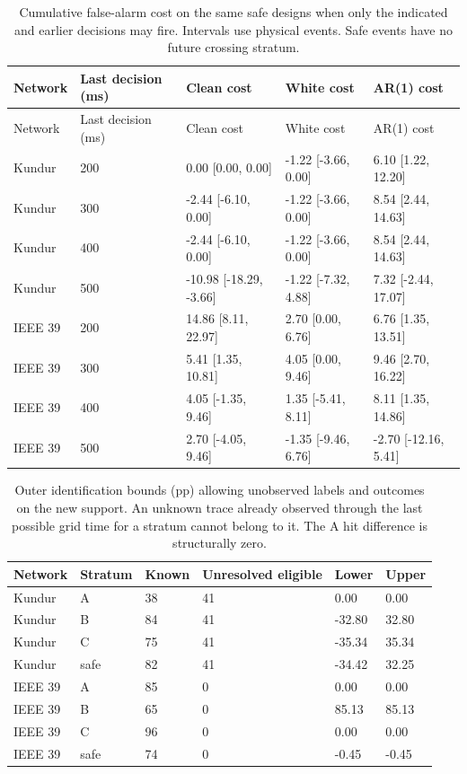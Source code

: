 \documentclass[10pt]{article}
\begin{document}
\begin{longtable}{@{}lllll@{}}
\caption{Cumulative false-alarm cost on the same safe designs when only the indicated and earlier decisions may fire. Intervals use physical events. Safe events have no future crossing stratum.}\label{tab:safetime}\\
\toprule Network & Last decision (ms) & Clean cost & White cost & AR(1) cost \\\midrule\endfirsthead
\toprule Network & Last decision (ms) & Clean cost & White cost & AR(1) cost \\\midrule\endhead
Kundur & 200 & 0.00 [0.00, 0.00] & -1.22 [-3.66, 0.00] & 6.10 [1.22, 12.20] \\
Kundur & 300 & -2.44 [-6.10, 0.00] & -1.22 [-3.66, 0.00] & 8.54 [2.44, 14.63] \\
Kundur & 400 & -2.44 [-6.10, 0.00] & -1.22 [-3.66, 0.00] & 8.54 [2.44, 14.63] \\
Kundur & 500 & -10.98 [-18.29, -3.66] & -1.22 [-7.32, 4.88] & 7.32 [-2.44, 17.07] \\
IEEE 39 & 200 & 14.86 [8.11, 22.97] & 2.70 [0.00, 6.76] & 6.76 [1.35, 13.51] \\
IEEE 39 & 300 & 5.41 [1.35, 10.81] & 4.05 [0.00, 9.46] & 9.46 [2.70, 16.22] \\
IEEE 39 & 400 & 4.05 [-1.35, 9.46] & 1.35 [-5.41, 8.11] & 8.11 [1.35, 14.86] \\
IEEE 39 & 500 & 2.70 [-4.05, 9.46] & -1.35 [-9.46, 6.76] & -2.70 [-12.16, 5.41] \\
\bottomrule\end{longtable}\endgroup\begin{table}[htbp]\centering\small
\caption{Outer identification bounds (pp) allowing unobserved labels and outcomes on the new support. An unknown trace already observed through the last possible grid time for a stratum cannot belong to it. The A hit difference is structurally zero.}\label{tab:newbounds}
\begin{tabular}{@{}llllll@{}}\toprule
Network & Stratum & Known & Unresolved eligible & Lower & Upper \\\midrule
Kundur & A & 38 & 41 & 0.00 & 0.00 \\
Kundur & B & 84 & 41 & -32.80 & 32.80 \\
Kundur & C & 75 & 41 & -35.34 & 35.34 \\
Kundur & safe & 82 & 41 & -34.42 & 32.25 \\
IEEE 39 & A & 85 & 0 & 0.00 & 0.00 \\
IEEE 39 & B & 65 & 0 & 85.13 & 85.13 \\
IEEE 39 & C & 96 & 0 & 0.00 & 0.00 \\
IEEE 39 & safe & 74 & 0 & -0.45 & -0.45 \\
\bottomrule\end{tabular}\end{table}
\end{document}
